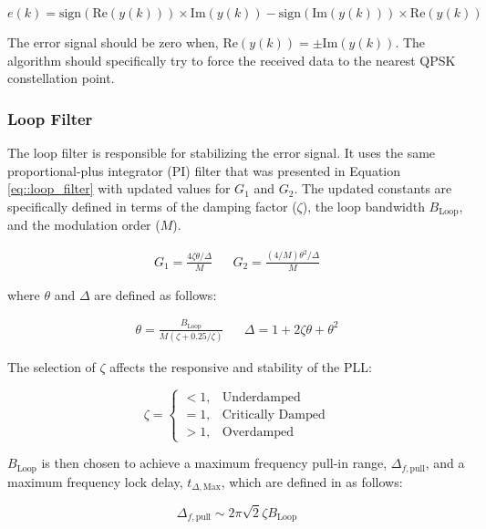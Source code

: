 \documentclass[conference,onecolumn]{IEEEtran}
\begin{document}
\begin{equation}
	e(k) = \text{sign}(\text{Re}(y(k))) \times \text{Im}(y(k)) - \text{sign}(\text{Im}(y(k))) \times \text{Re}(y(k))
\end{equation}

\noindent The error signal should be zero when, $\text{Re}(y(k)) = \pm\text{Im}(y(k))$. The algorithm should specifically try to force the received data to the nearest QPSK constellation point.

\subsubsection{Loop Filter}

The loop filter is responsible for stabilizing the error signal. It uses the same proportional-plus integrator (PI) filter that was presented in Equation \ref{eq::loop_filter} with updated values for $G_1$ and $G_2$. The updated constants are specifically defined in terms of the damping factor ($\zeta$), the loop bandwidth $B_{\text{Loop}}$, and the modulation order ($M$).

\begin{align}
	G_1 = \frac{4\zeta\theta/\Delta}{M} && G_2 = \frac{(4/M)\theta^2/\Delta}{M}
\end{align}

\noindent where $\theta$ and $\Delta$ are defined as follows:

\begin{align}
	\theta = \frac{B_{\text{Loop}}}{M(\zeta + 0.25/\zeta)} && \Delta = 1 + 2\zeta\theta + \theta^2
\end{align}

The selection of $\zeta$ affects the responsive and stability of the PLL:

\begin{equation}
\zeta = \begin{cases}
< 1, & \text{Underdamped}\\
= 1, & \text{Critically Damped}\\
> 1, & \text{Overdamped}
\end{cases}
\end{equation}

\noindent $B_\text{Loop}$ is then chosen to achieve a maximum frequency pull-in range, $\Delta_{f,\text{pull}}$, and a maximum frequency lock delay, $t_{\Delta,\text{Max}}$, which are defined in \cite{collins_2018_softwaredefined} as follows:

\begin{equation}
	\label{eq::max_freq_correct}
	\Delta_{f,\text{pull}} \sim 2\pi\sqrt{2}\zeta{B_\text{Loop}}\end{equation}
\end{document}
